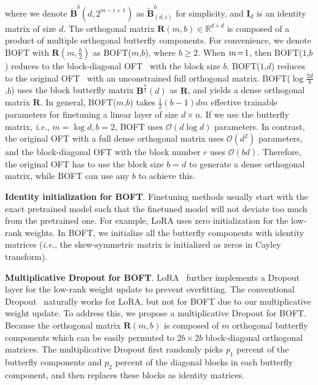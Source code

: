 where we denote $\tilde{\bm{B}}^b(d,2^{m - i+1})$ as $\tilde{\bm{B}}^b_{(d,i)}$ for simplicity, and $\bm{I}_d$ is an identity matrix of size $d$. The orthogonal matrix $\bm{R}(m,b)\in\mathbb{R}^{d\times d}$ is composed of a product of multiple orthogonal butterfly components. For convenience, we denote BOFT with $\bm{R}(m,\frac{b}{2})$ as BOFT($m$,$b$), where $b\geq 2$. When $\thickmuskip=2mu \medmuskip=2mu m=1$, then BOFT($1$,$b$) reduces to the block-diagonal OFT~\cite{qiu2023controlling} with the block size $b$. BOFT($1$,$d$) reduces to the original OFT~\cite{qiu2023controlling} with an unconstrained full orthogonal matrix. BOFT($\log \frac{2d}{b}$,$b$) uses the block butterfly matrix $\bm{B}^{\frac{b}{2}}(d)$ as $\bm{R}$, and yields a dense orthogonal matrix $\bm{R}$. In general, BOFT($m$,$b$) takes $\frac{1}{2}(b-1)dm$ effective trainable parameters for finetuning a linear layer of size $d\times n$. If we use the butterfly matrix, \emph{i.e.}, $m=\log d,b=2$, BOFT uses $\mathcal{O}(d\log d)$ parameters. In contrast, the original OFT with a full dense orthogonal matrix uses $\mathcal{O}(d^2)$ parameters, and the block-diagonal OFT with the block number $r$ uses $\mathcal{O}(bd)$. Therefore, the original OFT has to use the block size $b=d$ to generate a dense orthogonal matrix, while BOFT can use any $b$ to achieve this.

\textbf{Identity initialization for BOFT}. Finetuning methods usually start with the exact pretrained model such that the finetuned model will not deviate too much from the pretrained one. For example, LoRA uses zero initialization for the low-rank weights. In BOFT, we initialize all the butterfly components with identity matrices (\emph{i.e.}, the skew-symmetric matrix is initialized as zeros in Cayley transform).

\textbf{Multiplicative Dropout for BOFT}. LoRA~\cite{hulora2022} further implements a Dropout layer for the low-rank weight update to prevent overfitting. The conventional Dropout~\cite{srivastava2014dropout} naturally works for LoRA, but not for BOFT due to our multiplicative weight update. To address this, we propose a multiplicative Dropout for BOFT. Because the orthogonal matrix $\bm{R}(m,b)$ is composed of $m$ orthogonal butterfly components which can be easily permuted to $2b\times 2b$ block-diagonal orthogonal matrices. The multiplicative Dropout first randomly picks $p_1$ percent of the butterfly components and $p_2$ percent of the diagonal blocks in each butterfly component, and then replaces these blocks as identity matrices.

